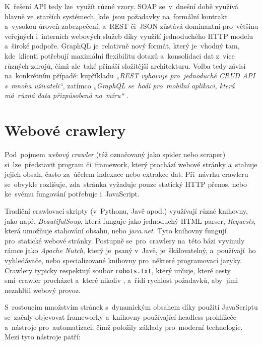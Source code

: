 K~řešení API tedy lze~využít různé vzory. SOAP se~v~dnešní době využívá
hlavně ve~starších systémech, kde~jsou požadavky na~formální kontrakt
a~vysokou úroveň zabezpečení, a~REST či~JSON zůstává dominantní pro~většinu
veřejných i~interních webových služeb díky využití jednoduchého HTTP modelu
a~široké podpoře. GraphQL je~relativně nový formát, který je~vhodný tam,
kde~klienti potřebují maximální flexibilitu dotazů a~konsolidaci dat
z~více různých zdrojů, čímž ale~také přináší složitější architekturu. Volba
tedy závisí na~konkrétním případě: kupříkladu \emph{„REST vyhovuje
pro~jednoduché CRUD API s~mnoha uživateli“}, zatímco \emph{„GraphQL se~hodí
pro~mobilní aplikaci, která má~různá data přizpůsobená na~míru“}
\cite{YHVfLHsNlUItkF6G,Sj7FFY7SXnJ6m41T}. %

\section{Webové crawlery}
\label{sec:research-crawlers}

Pod~pojmem \emph{webový crawler} (též označovaný jako spider nebo scraper)
si~lze~představit program či~framework, který prochází webové stránky
a~stahuje jejich obsah, často za~účelem indexace nebo extrakce dat.
Při~návrhu crawleru se~obvykle rozlišuje, zda~stránka vyžaduje pouze
statický HTTP přenos, nebo ke~svému fungování potřebuje i~JavaScript.

Tradiční crawlovací skripty (v~Pythonu, Javě apod.) využívají různé knihovny,
jako např. \emph{BeautifulSoup}, která funguje jako jednoduchý HTML parser,
\emph{Requests}, která umožňuje stahování obsahu, nebo \emph{java.net}. Tyto
knihovny fungují pro~statické webové stránky. Postupně se~pro~crawlery
na~této bázi vyvinuly rámce jako \emph{Apache Nutch}, který je~psaný v~Javě,
je~škálovatelný, a~používají~ho vyhledávače, nebo specializované knihovny
pro~některé programovací jazyky. Crawlery typicky respektují soubor
\texttt{robots.txt}, který určuje, které cesty smí~crawler procházet
a~které nikoliv \cite{YHVfLHsNlUItkF6G,adi8S69Mmo0Mi7FC}, %
a~řídí rychlost požadavků, aby~jimi nezahltil webový provoz.

S~rostoucím množstvím stránek s~dynamickým obsahem díky použití JavaScriptu
se~začaly objevovat frameworky a~knihovny používající headless prohlížeče
a~nástroje pro~automatizaci, čímž položily základy pro~moderní technologie.
Mezi tyto nástroje patří:

